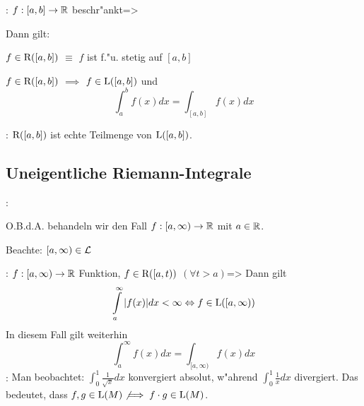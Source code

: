 \theorem:
  $f:[a,b]\to\mathbb R$ beschr"ankt=>{
  Dann gilt:
  \begin{stmts}
    \item $f\in{\rm R}([a,b])$ $\equiv$ $f$ ist f."u. stetig auf $[a,b]$
    \item $f\in{\rm R}([a,b])$ $\implies$ $f\in{\rm L}([a,b])$ und 
      \[\int_a^b f(x)dx=\int_{[a,b]} f(x) dx
        \]
    \end{stmts}
  }
\remark:{
  ${\rm R}([a,b])$ ist echte Teilmenge von ${\rm L}([a,b])$.
  }
\subsection{Uneigentliche Riemann-Integrale}
\remark:{
  O.B.d.A. behandeln wir den Fall $f:[a,\infty)\to\mathbb R$ mit $a\in\mathbb R$.
  
  Beachte: $[a,\infty)\in\mathcal{L}$
  }
\theorem:
  $f:[a,\infty)\to\mathbb R$ Funktion, $f\in{\rm R}([a,t))$ $(\forall t>a)$=>{
  Dann gilt
  \[\int_a^\infty |f(x)| dx<\infty \equiv f\in\SetLInt([a,\infty))
    \]
  In diesem Fall gilt weiterhin
  \[\int_a^\infty f(x) dx=\int_{[a,\infty)}f(x) dx
    \]
  }
\remark:{
  Man beobachtet: $\int_0^1 \frac 1 {\sqrt x} dx$ konvergiert absolut, w"ahrend
  $\int_0^1 \frac 1 x dx$ divergiert. Das bedeutet, dass 
  $f,g\in{\rm L}(M)\not\implies f\cdot g\in{\rm L}(M)$.
  }
